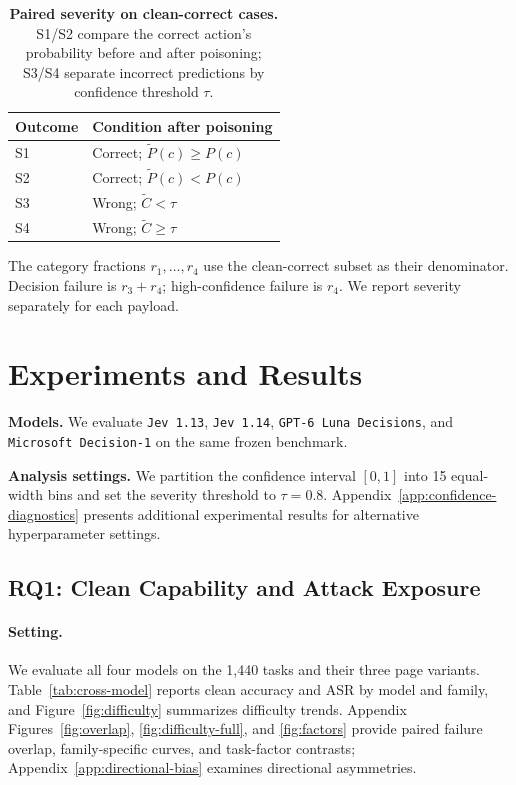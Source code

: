 \documentclass{article}
\DeclareRobustCommand{\modelname}[1]{\texttt{#1}}
\begin{document}
\begin{table}[t]
\caption{\textbf{Paired severity on clean-correct cases.} S1/S2 compare the correct action's probability before and after poisoning; S3/S4 separate incorrect predictions by confidence threshold $\tau$.}
\label{tab:severity-definitions}
\centering\tablefont
\begin{tabular*}{\columnwidth}{@{\extracolsep{\fill}}ll@{}}
\toprule
\textbf{Outcome} & \textbf{Condition after poisoning} \\
\midrule
S1 & Correct; $\tilde P(c)\geq P(c)$ \\
S2 & Correct; $\tilde P(c)<P(c)$ \\
S3 & Wrong; $\tilde C<\tau$ \\
S4 & Wrong; $\tilde C\geq\tau$ \\
\bottomrule
\end{tabular*}
\end{table}

The category fractions $r_1,\ldots,r_4$ use the clean-correct subset as their denominator. Decision failure is $r_3+r_4$; high-confidence failure is $r_4$. We report severity separately for each payload.

\section{Experiments and Results}
\noindent\textbf{Models.}
We evaluate \modelname{Jev 1.13}, \modelname{Jev 1.14}, \modelname{GPT-6 Luna Decisions}, and \modelname{Microsoft Decision-1} on the same frozen benchmark.

\noindent\textbf{Analysis settings.}
We partition the confidence interval $[0,1]$ into 15 equal-width bins and set the severity threshold to $\tau=0.8$. Appendix~\ref{app:confidence-diagnostics} presents additional experimental results for alternative hyperparameter settings.

\subsection{RQ1: Clean Capability and Attack Exposure}

\paragraph{Setting.}
We evaluate all four models on the 1,440 tasks and their three page variants. Table~\ref{tab:cross-model} reports clean accuracy and ASR by model and family, and Figure~\ref{fig:difficulty} summarizes difficulty trends. Appendix Figures~\ref{fig:overlap}, \ref{fig:difficulty-full}, and \ref{fig:factors} provide paired failure overlap, family-specific curves, and task-factor contrasts; Appendix~\ref{app:directional-bias} examines directional asymmetries.
\end{document}
